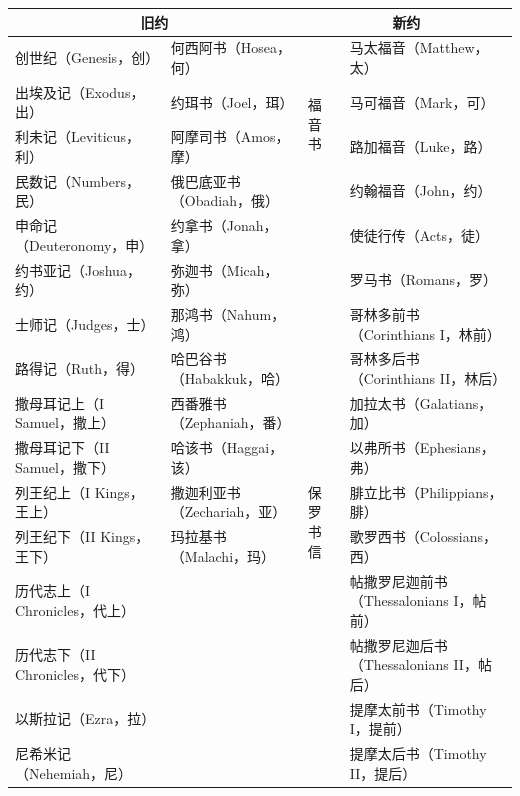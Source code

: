 \documentclass[12pt, a4paper, oneside]{ctexart}
\begin{document}
	\begin{table}[ht]
		\centering
		\tiny
		\begin{tabular}{|l l  | l |l | }
			\hline
			\multicolumn{2}{|c|}{旧约} & \multicolumn{2}{|c|}{新约} \\
			\hline
			创世纪（Genesis，创）  &  何西阿书（Hosea，何）   &\multirow{4}{*}{福音书} &马太福音（Matthew，太）    \\
			出埃及记（Exodus，出）  &  约珥书（Joel，珥）     &          &马可福音（Mark，可）           \\
			利未记（Leviticus，利）    &  阿摩司书（Amos，摩）    &        &路加福音（Luke，路）                      \\
			民数记（Numbers，民）         & 俄巴底亚书（Obadiah，俄）  &      &约翰福音（John，约）          \\
			\cline{3-4}
			申命记（Deuteronomy，申）     & 约拿书（Jonah，拿）    &           &使徒行传（Acts，徒）          \\
			\cline{3-4}
			约书亚记（Joshua，约）        & 弥迦书（Micah，弥）    & \multirow{13}{*}{保罗书信} &罗马书（Romans，罗） \\
			士师记（Judges，士）          & 那鸿书（Nahum，鸿）   &           &哥林多前书（Corinthians I，林前）   \\
			路得记（Ruth，得）            & 哈巴谷书（Habakkuk，哈）  &          &哥林多后书（Corinthians II，林后）     \\
			撒母耳记上（I Samuel，撒上）     & 西番雅书（Zephaniah，番）  &         &加拉太书（Galatians，加）           \\
			撒母耳记下（II Samuel，撒下）     & 哈该书（Haggai，该）     &         &以弗所书（Ephesians，弗）       \\
			列王纪上（I Kings，王上）        & 撒迦利亚书（Zechariah，亚） &            &腓立比书（Philippians，腓）\\
			列王纪下（II Kings，王下）        & 玛拉基书（Malachi，玛）    &            &歌罗西书（Colossians，西）\\
			历代志上（I Chronicles，代上）    &                &       & 帖撒罗尼迦前书（Thessalonians I，帖前）\\
			历代志下（II Chronicles，代下）   &                &       & 帖撒罗尼迦后书（Thessalonians II，帖后）\\
			以斯拉记（Ezra，拉）            &                &       & 提摩太前书（Timothy I，提前）\\
			尼希米记（Nehemiah，尼）        &                &       & 提摩太后书（Timothy II，提后）\\

\end{tabular}
\end{table}
\end{document}
